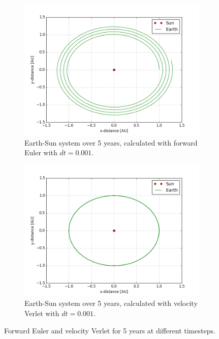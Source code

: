 \documentclass[10pt,showpacs,preprintnumbers,footinbib,amsmath,amssymb,aps,prl,twocolumn,groupedaddress,superscriptaddress,showkeys]{revtex4-1}
\begin{document}
\begin{figure}
	
    \begin{subfigure}[b]{0.3\textwidth}
		\includegraphics[width=\textwidth]{earth_sun_euler_5years_dt0_001.png}
		\caption{Earth-Sun system over 5 years, calculated with forward Euler with $dt = 0.001$.}
		\label{fig:s_s_euler_5yr_dt0_001}
	\end{subfigure}
	\begin{subfigure}[b]{0.3\textwidth}
		\includegraphics[width=\textwidth]{earth_sun_verlet_5years_dt0_001.png}
		\caption{Earth-Sun system over 5 years, calculated with velocity Verlet with $dt = 0.001$.}
		\label{fig:s_s_verlet_5yr_dt0_001}
	\end{subfigure}
	\caption{Forward Euler and velocity Verlet for 5 years at different timesteps.}
    \label{fig:euler_vs_verlet_5yr}
\end{figure}
\end{document}
